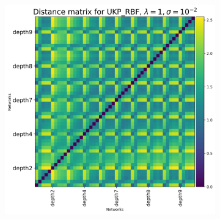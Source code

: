 \documentclass[11pt]{article}
\theoremstyle{plain}
\begin{document}
\begin{figure}[!h]
\begin{subfigure}[b]{0.3\textwidth}
    \end{subfigure}
    \hfill
    \begin{subfigure}[b]{0.3\textwidth}
        \includegraphics[width=\textwidth]{Appendix figures/mnist_experiments/Heatmaps/Heatmap for UKP_dist_RBF_1.000000e+00_1.000000e-02.png}
    \end{subfigure}
    
    \vspace{0.5cm}  %
    

\end{figure}
\end{document}
